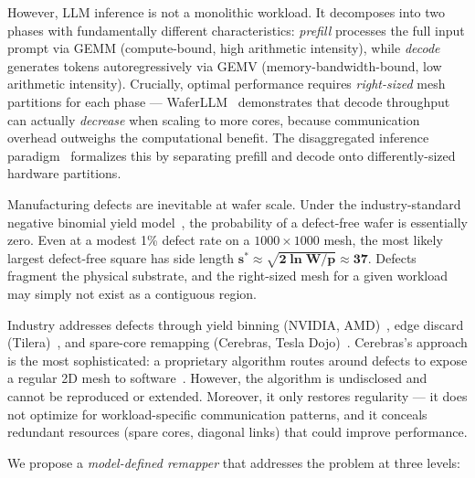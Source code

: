 \documentclass[sigplan,anonymous,review,nonacm]{acmart}
\begin{document}
However, LLM inference is not a monolithic workload. It decomposes into two phases with fundamentally different characteristics: \emph{prefill} processes the full input prompt via GEMM (compute-bound, high arithmetic intensity), while \emph{decode} generates tokens autoregressively via GEMV (memory-bandwidth-bound, low arithmetic intensity). Crucially, optimal performance requires \emph{right-sized} mesh partitions for each phase --- WaferLLM~\cite{he2025waferllm} demonstrates that decode throughput can actually \emph{decrease} when scaling to more cores, because communication overhead outweighs the computational benefit. The disaggregated inference paradigm~\cite{zhong2024distserve, patel2024splitwise} formalizes this by separating prefill and decode onto differently-sized hardware partitions.

Manufacturing defects are inevitable at wafer scale. Under the industry-standard negative binomial yield model~\cite{stapper1983}, the probability of a defect-free wafer is essentially zero. Even at a modest 1\% defect rate on a $1000 \times 1000$ mesh, the most likely largest defect-free square has side length $\boldsymbol{s^* \approx \sqrt{2\ln W / p} \approx 37}$. Defects fragment the physical substrate, and the right-sized mesh for a given workload may simply not exist as a contiguous region.

Industry addresses defects through yield binning (NVIDIA, AMD)~\cite{nvidia2020ga102, gamersnexus2013binning}, edge discard (Tilera)~\cite{tilera2013tilegx}, and spare-core remapping (Cerebras, Tesla Dojo)~\cite{cerebras2025sigops, talpes2023dojo}. Cerebras's approach is the most sophisticated: a proprietary algorithm routes around defects to expose a regular 2D mesh to software~\cite{luczynski2024reduce}. However, the algorithm is undisclosed and cannot be reproduced or extended. Moreover, it only restores regularity --- it does not optimize for workload-specific communication patterns, and it conceals redundant resources (spare cores, diagonal links) that could improve performance.

We propose a \emph{model-defined remapper} that addresses the problem at three levels:
\end{document}
